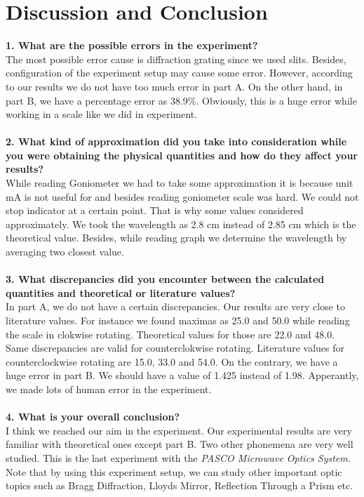 \documentclass[a4paper,12pt]{report}
\begin{document}
\chapter{Discussion and Conclusion}
\textbf{1. What are the possible errors in the experiment?}\\
The most possible error cause is diffraction grating since we used slits. Besides, configuration of the experiment setup may cause some error. However, according to our results we do not have too much error in part A. On the other hand, in part B, we have a percentage error as 38.9\%. Obviously, this is a huge error while working in a scale like we did in experiment.\\\\
\textbf{2. What kind of approximation did you take into consideration while you were obtaining the physical quantities and how do they affect your results?}\\
While reading Goniometer we had to take some approximation it is because unit mA is not useful for and besides reading goniometer scale was hard. We could not stop indicator at a certain point. That is why some values considered approximately. We took the wavelength as 2.8 cm instead of 2.85 cm which is the theoretical value. Besides, while reading graph we determine the wavelength by averaging two closest value.\\\\  
\textbf{3. What discrepancies did you encounter between the calculated quantities and theoretical or literature values?}\\
In part A, we do not have a certain discrepancies. Our results are very close to literature values. For instance we found maximas as 25.0 and 50.0 while reading the scale in clokwise rotating. Theoretical values for those are 22.0 and 48.0. Same discrepancies are valid for counterclokwise rotating. Literature values for counterclockwise rotating are 15.0, 33.0 and 54.0. On the contrary, we have a huge error in part B. We should have a value of 1.425 instead of 1.98. Apperantly, we made lots of human error in the experiment.\\\\ 
\textbf{4. What is your overall conclusion?}\\
I think we reached our aim in the experiment. Our experimental results are very familiar with theoretical ones except part B. Two other phonemena are very well studied. This is the last experiment with the \textit{PASCO Microwave Optics System.} Note that by using this experiment setup, we can study other important optic topics such as Bragg Diffraction, Lloyds Mirror, Reflection Through a Prism etc.
\end{document}
